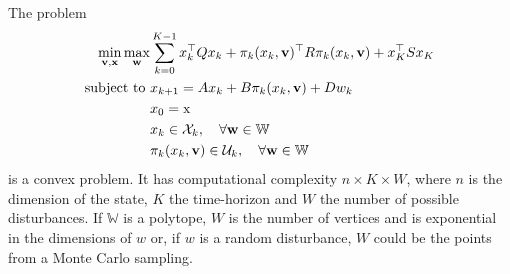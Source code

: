 The problem
\begin{equation*}
  \begin{aligned}
    \min_{\boldsymbol{\mathrm{v}},\boldsymbol{\mathrm{x}}} \max_{\boldsymbol{\mathrm{w}}} & \sum_{k=0}^{K-1} x_k^\top Qx_k + \pi_k(x_k,\boldsymbol{\mathrm{v}})^\top R \pi_k(x_k,\boldsymbol{\mathrm{v}}) + x_K^\top Sx_K\\
    \text{subject to } & x_{k+1} = Ax_k + B\pi_k(x_k,\boldsymbol{\mathrm{v}}) + Dw_k \\
                                 & x_0 = \textrm{x} \\
                                 & x_k\in \mathcal{X}_k,\quad \forall \boldsymbol{\mathrm{w}}\in \mathbb{W} \\
                                 & \pi_k(x_k,\boldsymbol{\mathrm{v}})\in \mathcal{U}_k,\quad \forall \boldsymbol{\mathrm{w}}\in \mathbb{W}
  \end{aligned}
\end{equation*}
is a convex problem. It has computational complexity $n\times K\times W$, where $n$ is the dimension of the state, $K$ the time-horizon and $W$ the number of possible disturbances. If $\mathbb{W}$ is a polytope, $W$ is the number of vertices and is exponential in the dimensions of $w$ or, if $w$ is a random disturbance, $W$ could be the points from a Monte Carlo sampling.


